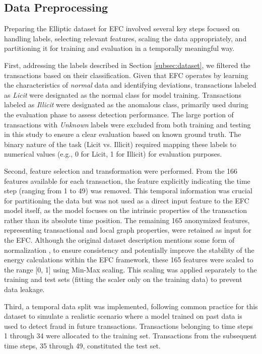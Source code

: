 \documentclass[12pt]{article}
\begin{document}
\subsection{Data Preprocessing} \label{subsec:preprocessing}

Preparing the Elliptic dataset for EFC involved several key steps focused on handling labels,
selecting relevant features, scaling the data appropriately, and partitioning it for training and evaluation in a temporally
meaningful way.

First, addressing the labels described in Section \ref{subsec:dataset}, we filtered the transactions based on their
classification. Given that EFC operates by learning the characteristics of \textit{normal} data and identifying deviations,
transactions labeled as \textit{Licit} were designated as the normal class for model training. Transactions labeled as \textit{Illicit}
were designated as the anomalous class, primarily used during the evaluation phase to assess detection performance. The
large portion of transactions with \textit{Unknown} labels were excluded from both training and testing in this study to ensure
a clear evaluation based on known ground truth. The binary nature of the task (Licit vs. Illicit) required mapping these
labels to numerical values (e.g., 0 for Licit, 1 for Illicit) for evaluation purposes.

Second, feature selection and transformation were performed. From the 166 features available for each transaction, the
feature explicitly indicating the time step (ranging from 1 to 49) was removed. This temporal information was crucial
for partitioning the data but was not used as a direct input feature to the EFC model itself, as the model focuses on the
intrinsic properties of the transaction rather than its absolute time position. The remaining 165 anonymized features,
representing transactional and local graph properties, were retained as input for the EFC. Although the original dataset
description mentions some form of normalization \cite{weber2019antimoneylaunderingbitcoinexperimenting}, to ensure consistency
and potentially improve the stability of the energy calculations within the EFC framework, these 165 features were scaled
to the range [0, 1] using Min-Max scaling. This scaling was applied separately to the training and test sets (fitting
the scaler only on the training data) to prevent data leakage.

Third, a temporal data split was implemented, following common practice for this dataset
\cite{weber2019antimoneylaunderingbitcoinexperimenting, lorenz2021machinelearningmethodsdetect} to simulate a realistic
scenario where a model trained on past data is used to detect fraud in future transactions. Transactions belonging to
time steps 1 through 34 were allocated to the training set. Transactions from the subsequent time steps, 35 through 49,
constituted the test set.
\end{document}
